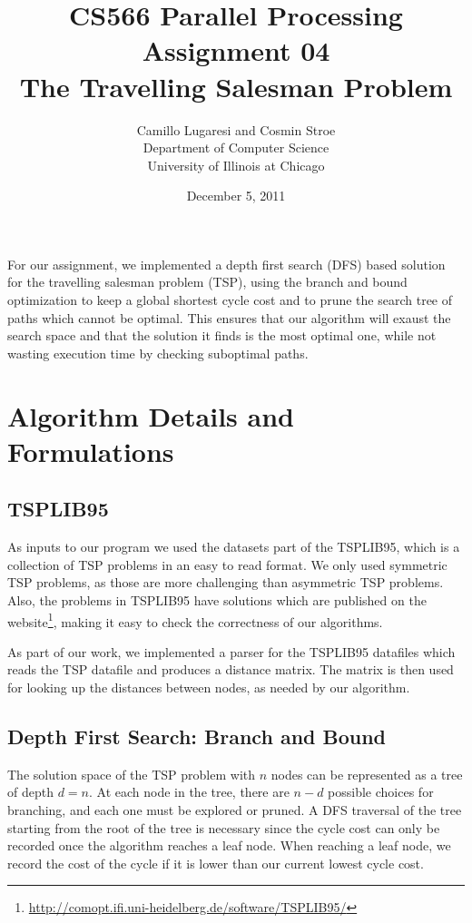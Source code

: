\documentclass{article}
\title{CS566 Parallel Processing \\ Assignment 04 \\ The Travelling Salesman Problem}
\author{Camillo Lugaresi and Cosmin Stroe \vspace{20pt} \\ Department
of Computer Science \\ University of Illinois at Chicago}
\date{December 5, 2011}
\begin{document}
\maketitle
\newpage

For our assignment, we implemented a depth first search (DFS) based solution for
the travelling salesman problem (TSP), using the branch and bound optimization
to keep a global shortest cycle cost and to prune the search tree of paths which
cannot be optimal.  This ensures that our algorithm will exaust the search space and 
that the solution it finds is the most optimal one, while not wasting execution time by 
checking suboptimal paths.

\section{Algorithm Details and Formulations}

\subsection{TSPLIB95}

As inputs to our program we used the datasets part of the TSPLIB95, which is a
collection of TSP problems in an easy to read format.  We only used symmetric
TSP problems, as those are more challenging than asymmetric TSP problems.  Also,
the problems in TSPLIB95 have solutions which are published on the
website\footnote{\url{http://comopt.ifi.uni-heidelberg.de/software/TSPLIB95/}},
making it easy to check the correctness of our algorithms.

As part of our work, we implemented a parser for the TSPLIB95 datafiles which
reads the TSP datafile and produces a distance matrix.  The matrix is then used
for looking up the distances between nodes, as needed by our algorithm.

\subsection{Depth First Search: Branch and Bound}

The solution space of the TSP problem with $n$ nodes can be represented as a
tree of depth $d = n$.  At each node in the tree, there are $n - d$ possible
choices for branching, and each one must be explored or pruned.  A DFS traversal
of the tree starting from the root of the tree is necessary since the cycle cost
can only be recorded once the algorithm reaches a leaf node.   When reaching a
leaf node, we record the cost of the cycle if it is lower than our current
lowest cycle cost.
\end{document}
